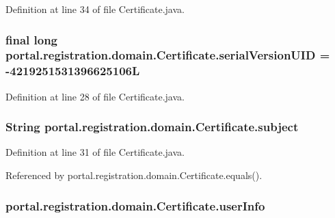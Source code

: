 Definition at line 34 of file Certificate.java.

\hypertarget{classportal_1_1registration_1_1domain_1_1Certificate_a7bc0118d146f99aa265f3b026fff8b4b}{
\subsubsection[{serialVersionUID}]{\setlength{\rightskip}{0pt plus 5cm}final long {\bf portal.registration.domain.Certificate.serialVersionUID} = -\/4219251531396625106L}}
\label{classportal_1_1registration_1_1domain_1_1Certificate_a7bc0118d146f99aa265f3b026fff8b4b}


Definition at line 28 of file Certificate.java.

\hypertarget{classportal_1_1registration_1_1domain_1_1Certificate_aa5e1b492240c17ca0b863da96627855f}{
\subsubsection[{subject}]{\setlength{\rightskip}{0pt plus 5cm}String {\bf portal.registration.domain.Certificate.subject}}}
\label{classportal_1_1registration_1_1domain_1_1Certificate_aa5e1b492240c17ca0b863da96627855f}


Definition at line 31 of file Certificate.java.



Referenced by portal.registration.domain.Certificate.equals().

\hypertarget{classportal_1_1registration_1_1domain_1_1Certificate_a17f801286e01e02c092b9a92b3220b13}{
\subsubsection[{userInfo}]{ {\bf portal.registration.domain.Certificate.userInfo}}}
\label{classportal_1_1registration_1_1domain_1_1Certificate_a17f801286e01e02c092b9a92b3220b13}



